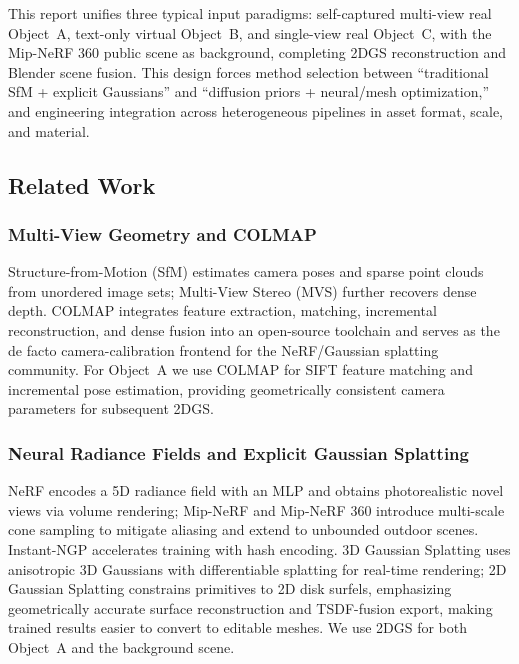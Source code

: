 \documentclass[10pt,twocolumn,letterpaper]{article}
\begin{document}
This report unifies three typical input paradigms: self-captured multi-view real Object~A, text-only virtual Object~B, and single-view real Object~C, with the Mip-NeRF 360\cite{barron2022mipnerf360} public scene as background, completing 2DGS reconstruction and Blender scene fusion. This design forces method selection between ``traditional SfM + explicit Gaussians'' and ``diffusion priors + neural/mesh optimization,'' and engineering integration across heterogeneous pipelines in asset format, scale, and material.

\subsection{Related Work}

\subsubsection{Multi-View Geometry and COLMAP}

Structure-from-Motion (SfM) estimates camera poses and sparse point clouds from unordered image sets; Multi-View Stereo (MVS) further recovers dense depth. COLMAP\cite{schoenberger2016sfm,schoenberger2016mvs} integrates feature extraction, matching, incremental reconstruction, and dense fusion into an open-source toolchain and serves as the de facto camera-calibration frontend for the NeRF/Gaussian splatting community. For Object~A we use COLMAP for SIFT feature matching and incremental pose estimation, providing geometrically consistent camera parameters for subsequent 2DGS.

\subsubsection{Neural Radiance Fields and Explicit Gaussian Splatting}

NeRF\cite{mildenhall2020nerf} encodes a 5D radiance field with an MLP and obtains photorealistic novel views via volume rendering; Mip-NeRF\cite{barron2021mipnerf} and Mip-NeRF 360\cite{barron2022mipnerf360} introduce multi-scale cone sampling to mitigate aliasing and extend to unbounded outdoor scenes. Instant-NGP\cite{muller2022instantngp} accelerates training with hash encoding. 3D Gaussian Splatting\cite{kerbl2023gaussians} uses anisotropic 3D Gaussians with differentiable splatting for real-time rendering; 2D Gaussian Splatting\cite{huang20242dgs} constrains primitives to 2D disk surfels, emphasizing geometrically accurate surface reconstruction and TSDF-fusion export, making trained results easier to convert to editable meshes. We use 2DGS for both Object~A and the background scene.
\end{document}
